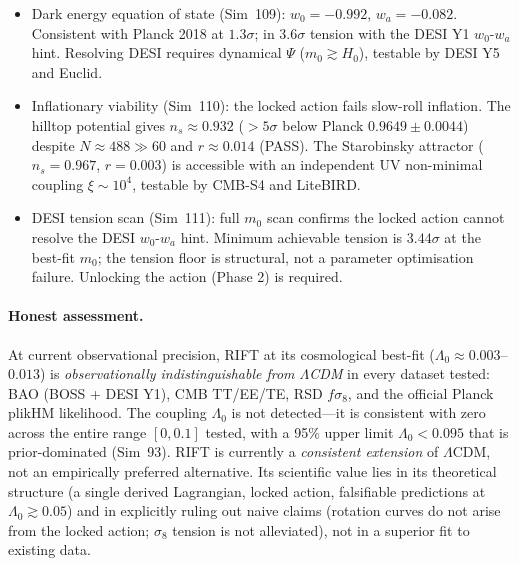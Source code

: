 \documentclass[12pt,a4paper]{article}
\begin{document}
\begin{itemize}
  \item Dark energy equation of state (Sim~109): $w_0=-0.992$, $w_a=-0.082$.  Consistent with Planck 2018 at $1.3\sigma$; in $3.6\sigma$ tension with the DESI Y1 $w_0$-$w_a$ hint.  Resolving DESI requires dynamical $\Psi$ ($m_0\gtrsim H_0$), testable by DESI Y5 and Euclid.
  \item Inflationary viability (Sim~110): the locked action fails slow-roll inflation.  The hilltop potential gives $n_s\approx0.932$ ($>5\sigma$ below Planck $0.9649\pm0.0044$) despite $N\approx488\gg60$ and $r\approx0.014$ (PASS).  The Starobinsky attractor ($n_s=0.967$, $r=0.003$) is accessible with an independent UV non-minimal coupling $\xi\sim10^4$, testable by CMB-S4 and LiteBIRD.
  \item DESI tension scan (Sim~111): full $m_0$ scan confirms the locked action cannot resolve the DESI $w_0$-$w_a$ hint.  Minimum achievable tension is $3.44\sigma$ at the best-fit $m_0$; the tension floor is structural, not a parameter optimisation failure.  Unlocking the action (Phase 2) is required.
\end{itemize}

\paragraph{Honest assessment.}
At current observational precision, RIFT at its cosmological best-fit
($\Lambda_0 \approx 0.003$--$0.013$) is \emph{observationally indistinguishable
from $\Lambda$CDM} in every dataset tested: BAO (BOSS + DESI Y1), CMB TT/EE/TE,
RSD $f\sigma_8$, and the official Planck plikHM likelihood.  The coupling
$\Lambda_0$ is not detected---it is consistent with zero across the entire
range $[0, 0.1]$ tested, with a 95\% upper limit $\Lambda_0 < 0.095$ that
is prior-dominated (Sim~93).  RIFT is currently a \emph{consistent extension}
of $\Lambda$CDM, not an empirically preferred alternative.  Its scientific
value lies in its theoretical structure (a single derived Lagrangian, locked
action, falsifiable predictions at $\Lambda_0 \gtrsim 0.05$) and in explicitly
ruling out naive claims (rotation curves do not arise from the locked action;
$\sigma_8$ tension is not alleviated), not in a superior fit to existing data.
\end{document}
